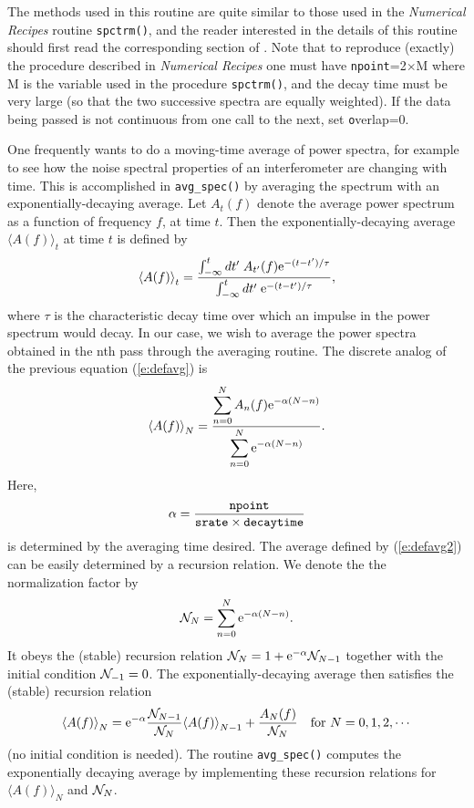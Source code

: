 The methods used in this routine are quite similar to those used in
the {\it Numerical Recipes} \cite{NumRec} routine {\tt spctrm()}, and
the reader interested in the details of this routine should first read
the corresponding section of \cite{NumRec}.  Note that to reproduce
(exactly) the procedure described in {\it Numerical Recipes}
\cite{NumRec} one must have {\tt npoint}=2$\times$M where M is the
variable used in the procedure {\tt spctrm()}, and the decay time must
be very large (so that the two successive spectra are equally
weighted).  If the data being passed is not continuous from one call
to the next, set {\texttt overlap}=0.

One frequently  wants to do a moving-time average of power spectra, for
example to see how the noise spectral properties of an interferometer
are changing with time.  This is accomplished in {\tt avg\_spec()} by
averaging the spectrum with an exponentially-decaying average.  Let
$A_{t}(f)$ denote the average power spectrum as a function of frequency
$f$, at time $t$.  Then the exponentially-decaying average ${\langle
A(f) \rangle}_t$ at time $t$ is defined by
\begin{equation}
\label{e:defavg}
{\langle A(f) \rangle}_t = {
  \int_{-\infty}^t dt' \;  A_{t'}(f) {\rm e}^{-(t-t')/\tau} 
\over 
  \int_{-\infty}^t dt' \; {\rm e}^{-(t-t')/\tau} 
},
\end{equation}
where $\tau$ is the characteristic decay time over which an impulse in
the power spectrum would decay.  In our case, we wish to average the
power spectra obtained in the nth pass through the averaging routine.
The discrete analog of the previous equation (\ref{e:defavg}) is
\begin{equation}
\label{e:defavg2}
{\langle A(f) \rangle}_N = {
  \displaystyle \sum_{n=0}^N  A_n(f) {\rm e}^{-\alpha (N-n) } 
\over 
\displaystyle  \sum_{n=0}^N {\rm e}^{-\alpha (N-n) } 
}.
\end{equation}
Here, 
\begin{equation}
\alpha = { {\tt npoint} \over {\tt srate} \times {\tt decaytime} }
\end{equation}
is determined by the averaging time desired.  The average defined by
(\ref{e:defavg2}) can be easily determined by a recursion relation.  We
denote the the normalization factor by
\begin{equation}
{\cal N}_N = \sum_{n=0}^N {\rm e}^{-\alpha (N-n) }.
\end{equation}
It obeys the (stable) recursion relation ${\cal N}_{N} = 1+ {\rm
e}^{-\alpha} {\cal N}_{N-1}$ together with the initial condition $
{\cal N}_{-1}=0$.  The exponentially-decaying average then satisfies
the (stable) recursion relation
\begin{equation}
{\langle A(f) \rangle}_{N} = {\rm e}^{-\alpha} {{\cal N}_{N-1} \over
{\cal N}_{N} } {\langle A(f) \rangle}_{N-1} + { A_{N}(f) \over {\cal
N}_{N} } \quad {\rm for\ } N=0,1,2,\cdots
\end{equation}
(no initial condition is needed).  The routine {\tt avg\_spec()}
computes the exponentially decaying average by implementing these
recursion relations for ${\langle A(f) \rangle}_{N} $ and ${\cal
N}_N$.

